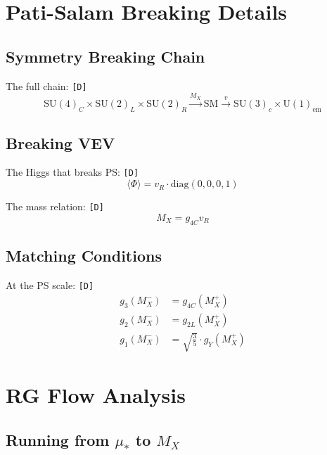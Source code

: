 \documentclass[11pt,a4paper]{article}
\newcommand{\tagD}{\textcolor{green!50!black}{\texttt{[D]}}}
\theoremstyle{definition}
\begin{document}
\section{Pati-Salam Breaking Details}
\label{app:ps-breaking}

\subsection{Symmetry Breaking Chain}
\label{app:chain}

The full chain: \tagD{}
\begin{equation}
\label{eq:chain-1}
\text{SU}(4)_C \times \text{SU}(2)_L \times \text{SU}(2)_R \xrightarrow{M_X} \text{SM} \xrightarrow{v} \text{SU}(3)_c \times \text{U}(1)_{\text{em}}
\end{equation}

\subsection{Breaking VEV}
\label{app:vev}

The Higgs that breaks PS: \tagD{}
\begin{equation}
\label{eq:vev-1}
\langle \Phi \rangle = v_R \cdot \text{diag}(0, 0, 0, 1)
\end{equation}

The mass relation: \tagD{}
\begin{equation}
\label{eq:vev-mx}
M_X = g_{4C} v_R
\end{equation}

\subsection{Matching Conditions}
\label{app:ps-match}

At the PS scale: \tagD{}
\begin{align}
\label{eq:ps-match-1}
g_3(M_X^-) &= g_{4C}(M_X^+) \\
\label{eq:ps-match-2}
g_2(M_X^-) &= g_{2L}(M_X^+) \\
\label{eq:ps-match-3}
g_1(M_X^-) &= \sqrt{\frac{3}{5}} \cdot g_Y(M_X^+)
\end{align}

\section{RG Flow Analysis}
\label{app:rg-flow}

\subsection{Running from $\mu_*$ to $M_X$}
\label{app:run-mu-mx}
\end{document}
